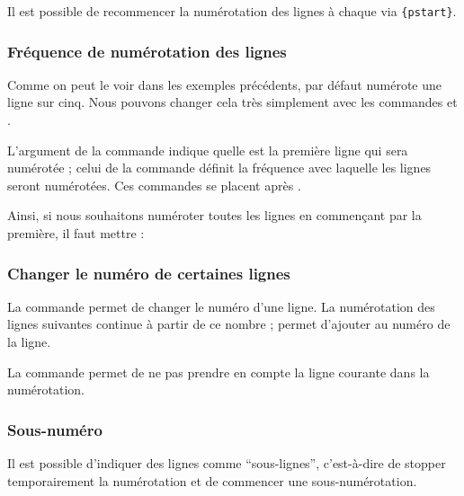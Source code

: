 \begin{plusloins}
Il est possible de recommencer la numérotation des lignes à chaque   via \verb={pstart}=.
\end{plusloins}

\subsubsection{Fréquence de numérotation des lignes}

Comme on peut le voir dans les exemples précédents, par défaut  numérote  une ligne sur cinq. Nous pouvons changer cela très simplement avec les commandes 
 et .

L'argument  de la commande  indique quelle est  la première ligne qui sera numérotée 
; celui de la commande  définit la fréquence avec laquelle les lignes seront numérotées. Ces commandes se placent après . 

Ainsi, si nous souhaitons numéroter toutes les lignes en commençant par la première, il faut mettre :

\begin{latexcode}
\end{latexcode}



\subsubsection{Changer le numéro de certaines lignes}

La commande  permet de changer le numéro d'une ligne. La numérotation des lignes suivantes  continue à partir de ce nombre ;  permet d'ajouter  au numéro de la ligne.

La commande  permet de ne pas prendre en compte la ligne courante dans la numérotation.

\subsubsection{Sous-numéro}

Il est possible d'indiquer  des lignes comme \enquote{sous-lignes}, c'est-à-dire de stopper temporairement la numérotation et de commencer une sous-numérotation.

